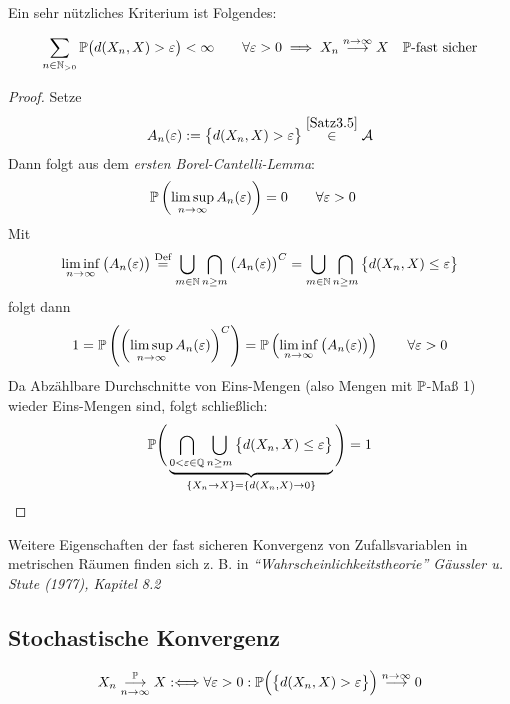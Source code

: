 Ein sehr nützliches Kriterium ist Folgendes:
\begin{satz}\label{Satz3.10} %
\begin{align*}
\sum\limits_{n\in\N_{>0}}\P\big(d(X_n,X)>\varepsilon\big)<\infty\qquad\forall\varepsilon>0
\implies
X_n
\stackrel{n\to\infty}{\longrightarrow}
X\quad\P\text{-fast sicher}
\end{align*}
\end{satz}
\begin{proof}
Setze
\begin{align*}
A_n(\varepsilon):=\big\lbrace d(X_n,X)>\varepsilon\big\rbrace\stackrel{\ref{Satz3.5}}{\in}\A
\end{align*}
Dann folgt aus dem \textit{ersten Borel-Cantelli-Lemma}:
\begin{align*}
&\P\left(\limsup\limits_{n\to\infty} A_n(\varepsilon)\right)=0\qquad\forall\varepsilon>0
\end{align*}
Mit
\begin{align*}
\liminf\limits_{n\to\infty}\big(A_n(\varepsilon)\big)
\stackeq{\text{Def}}
\bigcup\limits_{m\in\N}\bigcap\limits_{n\geq m}\big(A_n(\varepsilon)\big)^C
=
\bigcup\limits_{m\in\N}\bigcap\limits_{n\geq m}\big\lbrace d(X_n,X)\leq\varepsilon\big\rbrace
\end{align*}
folgt dann
\begin{align*}
1=\P\left(\left(\limsup\limits_{n\to\infty} A_n(\varepsilon)\right)^C\right)
=\P\left(\liminf\limits_{n\to\infty}\big(A_n(\varepsilon)\big)\right)\qquad\forall\varepsilon>0
\end{align*}
Da Abzählbare Durchschnitte von Eins-Mengen (also Mengen mit $\P$-Maß 1) wieder Eins-Mengen sind, folgt schließlich:
\begin{align*}
\P\Bigg(\underbrace{\bigcap\limits_{0<\varepsilon\in\Q}\bigcup\limits_{n\geq m}\big\lbrace d(X_n,X)\leq\varepsilon\big\rbrace}_{\lbrace X_n\to X\rbrace=\lbrace d(X_n,X)\to0\rbrace}\Bigg)=1
\end{align*}
\end{proof}
Weitere Eigenschaften der fast sicheren Konvergenz von Zufallsvariablen in metrischen Räumen finden sich z. B. in \textit{``Wahrscheinlichkeitstheorie'' Gäussler u. Stute (1977), Kapitel 8.2}

\subsection*{Stochastische Konvergenz} %
\begin{definition} %
\begin{align*}
X_n
\stackrelnew{n\to\infty}{\P}{\longrightarrow}
X:\Longleftrightarrow\forall\varepsilon>0:
\P\Big(\big\lbrace d(X_n,X)>\varepsilon\big\rbrace\Big)
\stackrel{n\to\infty}{\longrightarrow}
0
\end{align*}
\end{definition}

